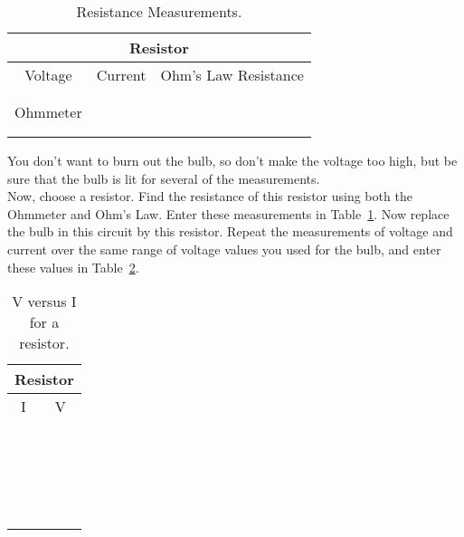 \begin{table}[htb]
\begin{center}
\begin{tabular}{|c|c|c|}
\hline
\multicolumn{3}{|c|}{Resistor} \\
\hline 
Voltage & Current & Ohm's Law Resistance \\ 
\hline
\hspace*{3cm} & \hspace*{3cm} & \hspace*{3cm} \\ 
& &  \\ 
\hline
Ohmmeter &  &  \\ 
\hline
& &  \\
& &  \\
\hline
\end{tabular}
\end{center}
\caption{Resistance Measurements.}
\label{tab:DC:newres}
\end{table}

You don't want to burn out the bulb, so don't make the voltage too high, but 
be sure that the bulb is lit for several of the measurements.  \\

Now, choose a resistor.
Find the resistance of this resistor using both the Ohmmeter and Ohm's Law.
Enter these measurements in Table~\ref{tab:DC:newres}.
Now replace the bulb in this circuit by this resistor.  
Repeat the measurements of voltage and current
over the same range of voltage values you used for the bulb, and enter these
values in Table~\ref{tab:DC:resisplot}. 


\begin{table}[htb]
\begin{center}
\begin{tabular}{|c|c|}
\hline
\multicolumn{2}{|c|}{Resistor}\\
\hline
I & V \\
\hline
\hspace*{5cm} & \hspace*{5cm} \\
& \\
\hline
& \\
& \\
\hline
& \\
& \\
\hline
& \\
& \\
\hline
& \\
& \\
\hline
& \\
& \\
\hline
& \\
& \\
\hline
& \\
& \\
\hline
& \\
& \\
\hline
& \\
& \\
\hline
\end{tabular}
\end{center}
\caption{V versus I for a resistor.}
\label{tab:DC:resisplot}
\end{table}


